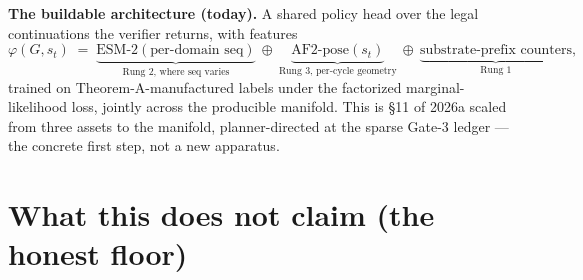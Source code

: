 \documentclass[11pt]{article}
\theoremstyle{plain}
\theoremstyle{definition}
\begin{document}
\noindent\textbf{The buildable architecture (today).} A shared policy head over the legal continuations the verifier returns, with features
\[
\varphi(G,s_t)\;=\;\underbrace{\mathrm{ESM\text{-}2}(\text{per-domain seq})}_{\text{Rung 2, where seq varies}}\ \oplus\ \underbrace{\mathrm{AF2\text{-}pose}(s_t)}_{\text{Rung 3, per-cycle geometry}}\ \oplus\ \underbrace{\text{substrate-prefix counters}}_{\text{Rung 1}},
\]
trained on Theorem-A-manufactured labels under the factorized marginal-likelihood loss, jointly across the producible manifold. This is \S11 of 2026a scaled from three assets to the manifold, planner-directed at the sparse Gate-3 ledger --- the concrete first step, not a new apparatus.

\section{What this does not claim (the honest floor)}
\label{sec:limits}
\end{document}

